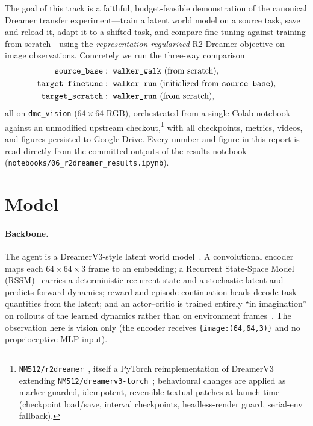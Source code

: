 \documentclass[11pt]{article}
\begin{document}
The goal of this track is a faithful, budget-feasible demonstration of the
canonical Dreamer transfer experiment---train a latent world model on a source
task, save and reload it, adapt it to a shifted task, and compare fine-tuning
against training from scratch---using the \emph{representation-regularized}
R2-Dreamer objective on image observations. Concretely we run the three-way
comparison
\[
\begin{aligned}
\texttt{source\_base} &:~\texttt{walker\_walk}~\text{(from scratch)},\\
\texttt{target\_finetune} &:~\texttt{walker\_run}~\text{(initialized from \texttt{source\_base})},\\
\texttt{target\_scratch} &:~\texttt{walker\_run}~\text{(from scratch)},
\end{aligned}
\]
all on \texttt{dmc\_vision} ($64\times64$ RGB), orchestrated from a single Colab
notebook against an unmodified upstream checkout,\footnote{\texttt{NM512/r2dreamer}~\cite{r2dreamer},
itself a PyTorch reimplementation of DreamerV3~\cite{dreamerv3} extending
\texttt{NM512/dreamerv3-torch}~\cite{dreamerv3torch}; behavioural changes are
applied as marker-guarded, idempotent, reversible textual patches at launch
time (checkpoint load/save, interval checkpoints, headless-render guard,
serial-env fallback).} with all checkpoints, metrics, videos, and figures
persisted to Google Drive. Every number and figure in this report is read
directly from the committed outputs of the results notebook
(\texttt{notebooks/06\_r2dreamer\_results.ipynb}).

\section{Model}
\label{sec:model}

\paragraph{Backbone.} The agent is a DreamerV3-style latent world
model~\cite{dreamerv3,dreamerv2,dreamer}. A convolutional encoder maps each
$64\times64\times3$ frame to an embedding; a Recurrent State-Space Model
(RSSM)~\cite{planet} carries a deterministic recurrent state and a stochastic
latent and predicts forward dynamics; reward and episode-continuation heads
decode task quantities from the latent; and an actor--critic is trained
entirely ``in imagination'' on rollouts of the learned dynamics rather than on
environment frames~\cite{dreamer}. The observation here is vision only (the
encoder receives \texttt{\{image:(64,64,3)\}} and no proprioceptive MLP input).
\end{document}
